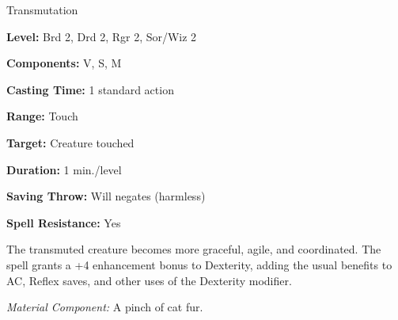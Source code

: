 
Transmutation

\textbf{Level:} Brd 2, Drd 2, Rgr 2, Sor/Wiz 2

\textbf{Components:} V, S, M

\textbf{Casting Time:} 1 standard action

\textbf{Range:} Touch

\textbf{Target:} Creature touched

\textbf{Duration:} 1 min./level

\textbf{Saving Throw:} Will negates (harmless)

\textbf{Spell Resistance:} Yes

The transmuted creature becomes more graceful, agile, and coordinated. The spell 
grants a +4 enhancement bonus to Dexterity, adding the usual benefits to AC, Reflex 
saves, and other uses of the Dexterity modifier.

\textit{Material Component:} A pinch of cat fur.

